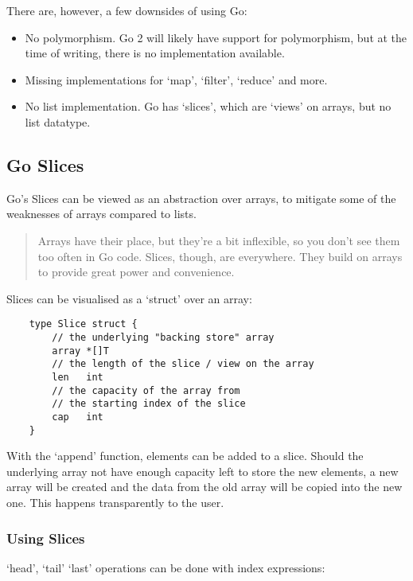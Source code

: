 There are, however, a few downsides of using Go:

\begin{itemize}
    \item No polymorphism. Go 2 will likely have support for polymorphism, but at the time of writing,
        there is no implementation available.
    \item Missing implementations for `map', `filter', `reduce' and more.
    \item No list implementation. Go has `slices', which are `views' on arrays, but
        no list datatype.
\end{itemize}

\subsection{Go Slices}

Go's Slices can be viewed as an abstraction over arrays, to mitigate some of the weaknesses of arrays
compared to lists.

\begin{quote}
    Arrays have their place, but they're a bit inflexible, so you don't see them too often in Go code.
    Slices, though, are everywhere. They build on arrays to provide great power and convenience.\cite{golang-slices}
\end{quote}

Slices can be visualised as a `struct' over an array:

\begin{verbatim}
    type Slice struct {
        // the underlying "backing store" array
        array *[]T
        // the length of the slice / view on the array
        len   int
        // the capacity of the array from
        // the starting index of the slice
        cap   int
    }
\end{verbatim}

With the `append' function, elements can be added to a slice. Should the underlying array not have enough
capacity left to store the new elements, a new array will be created and the data from the old array will
be copied into the new one. This happens transparently to the user.

\subsubsection{Using Slices}

`head', `tail' `last' operations can be done with index expressions:

